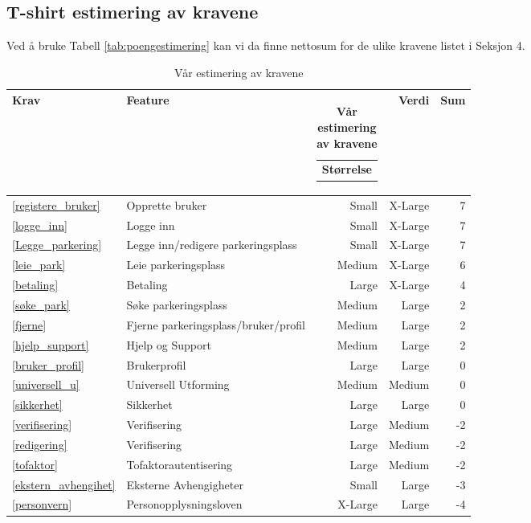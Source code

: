 \subsection{T-shirt estimering av kravene}
Ved å bruke Tabell \ref{tab:poengestimering} kan vi da finne nettosum for de ulike kravene listet i Seksjon 4. 
\begin{table}[H]
    \centering
    \begin{tabularx}{\textwidth}{llrrr} %
        \textbf{Krav} &\textbf{Feature} & \begin{tabular}[c]{@{}l@{}} \textbf{Størrelse} \end{tabular} & \textbf{Verdi}  & \textbf{Sum} \\ \hline 
         \ref{registere_bruker} & Opprette bruker & Small & X-Large & 7 \\ \hline
         \ref{logge_inn} & Logge inn & Small & X-Large & 7 \\ \hline
         \ref{Legge_parkering} &  Legge inn/redigere parkeringsplass  &Small & X-Large & 7 \\ \hline
         \ref{leie_park} & Leie parkeringsplass &Medium & X-Large & 6 \\ \hline
         \ref{betaling} & Betaling &Large & X-Large & 4\\ \hline
         \ref{søke_park} & Søke parkeringsplass &Medium & Large & 2 \\
         \hline
         \ref{fjerne} &  Fjerne parkeringsplass/bruker/profil &Medium & Large & 2 \\ \hline
          \ref{hjelp_support} & Hjelp og Support &Medium & Large & 2 \\ \hline
         \ref{bruker_profil} & Brukerprofil &Large & Large & 0 \\ \hline
         \ref{universell_u} & Universell Utforming &Medium & Medium & 0 \\ \hline
         \ref{sikkerhet} & Sikkerhet &Large & Large & 0 \\ \hline
          \ref{verifisering}& Verifisering &Large & Medium & -2 \\ \hline
         \ref{redigering} & Verifisering &Large & Medium & -2 \\ \hline
         \ref{tofaktor}& Tofaktorautentisering & Large & Medium & -2 \\ \hline
         \ref{ekstern_avhengihet} & Eksterne Avhengigheter &Small & Large & -3 \\ \hline
        \ref{personvern}& Personopplysningsloven &X-Large & Large & -4 \\ \hline
    \end{tabularx}
    \caption{Vår estimering av kravene}
    \label{tab:Kravestimering}
\end{table}

